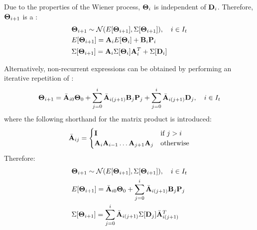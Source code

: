 Due to the properties of the Wiener process, $\mathbf{\Theta}_i$ is independent of $\mathbf{D}_i$. Therefore, $\mathbf{\Theta}_{i+1}$ is a \mnrv:
\begin{align*}
  & \mathbf{\Theta}_{i + 1} \sim \mathcal{N}(E[\mathbf{\Theta}_{i + 1}], \Sigma[\mathbf{\Theta}_{i + 1}]), \hspace{10pt} i \in I_t \\
  & E[\mathbf{\Theta}_{i+1}] = \mathbf{A}_i E[\mathbf{\Theta}_i] + \mathbf{B}_i \mathbf{P}_i \\
  & \Sigma[\mathbf{\Theta}_{i+1}] = \mathbf{A}_i \Sigma[\mathbf{\Theta}_i] \mathbf{A}^T_i + \Sigma[\mathbf{D}_i]
\end{align*}

Alternatively, non-recurrent expressions can be obtained by performing an iterative repetition of :
\begin{equation*}
  \mathbf{\Theta}_{i + 1} = \Bar{\mathbf{A}}_{i0} \mathbf{\Theta}_0 + \sum_{j = 0}^{i} \Bar{\mathbf{A}}_{i(j+1)} \mathbf{B}_j \mathbf{P}_j + \sum_{j = 0}^{i} \Bar{\mathbf{A}}_{i(j+1)} \mathbf{D}_j, \hspace{10pt} i \in I_t
\end{equation*}
where the following shorthand for the matrix product is introduced:
\[
  \Bar{\mathbf{A}}_{ij} = \begin{cases}
    \mathbf{I} & \mbox{if } j > i \\
    \mathbf{A}_i \mathbf{A}_{i - 1} \dots \mathbf{A}_{j + 1} \mathbf{A}_j & \mbox{otherwise}
  \end{cases}
\]
Therefore:
\begin{align*}
  & \mathbf{\Theta}_{i + 1} \sim \mathcal{N}(E[\mathbf{\Theta}_{i + 1}], \Sigma[\mathbf{\Theta}_{i + 1}]), \hspace{10pt} i \in I_t \\
  & E[\mathbf{\Theta}_{i + 1}] = \Bar{\mathbf{A}}_{i0} \mathbf{\Theta}_0 + \sum_{j = 0}^{i} \Bar{\mathbf{A}}_{i(j+1)} \mathbf{B}_j \mathbf{P}_j \\
  & \Sigma[\mathbf{\Theta}_{i + 1}] = \sum_{j = 0}^{i} \Bar{\mathbf{A}}_{i(j+1)} \Sigma[\mathbf{D}_j] \Bar{\mathbf{A}}_{i(j+1)}^T
\end{align*}
